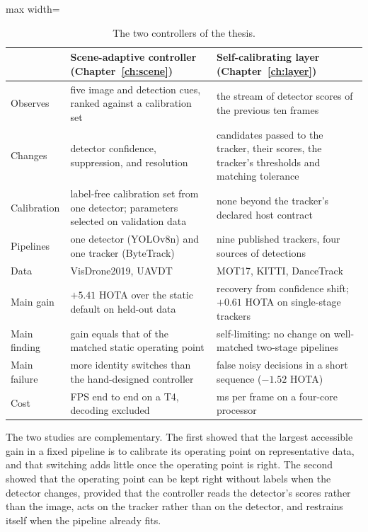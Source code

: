 \begin{table}[tbp]
\centering
\caption{The two controllers of the thesis.}
\label{tab:c-compare}
\small\setlength{\tabcolsep}{4pt}
\begin{adjustbox}{max width=\textwidth}
\begin{tabular}{>{\raggedright\arraybackslash}p{3.1cm}>{\raggedright\arraybackslash}p{5.6cm}>{\raggedright\arraybackslash}p{5.6cm}}
\toprule
 & Scene-adaptive controller (Chapter~\ref{ch:scene}) & Self-calibrating layer (Chapter~\ref{ch:layer}) \\
\midrule
Observes & five image and detection cues, ranked against a calibration set & the stream of detector scores of the previous ten frames \\
Changes & detector confidence, suppression, and resolution & candidates passed to the tracker, their scores, the tracker's thresholds and matching tolerance \\
Calibration & label-free calibration set from one detector; parameters selected on validation data & none beyond the tracker's declared host contract \\
Pipelines & one detector (YOLOv8n) and one tracker (ByteTrack) & nine published trackers, four sources of detections \\
Data & VisDrone2019, UAVDT & MOT17, KITTI, DanceTrack \\
Main gain & $+5.41$ HOTA over the static default on held-out data & recovery from confidence shift; $+0.61$ HOTA on single-stage trackers \\
Main finding & gain equals that of the matched static operating point & self-limiting: no change on well-matched two-stage pipelines \\
Main failure & more identity switches than the hand-designed controller & false noisy decisions in a short sequence ($-1.52$ HOTA) \\
Cost & 38.98 FPS end to end on a T4, decoding excluded & 2.95 ms per frame on a four-core processor \\
\bottomrule
\end{tabular}
\end{adjustbox}
\end{table}

The two studies are complementary. The first showed that the largest accessible gain in a fixed pipeline is to calibrate its operating point on representative data, and that switching adds little once the operating point is right. The second showed that the operating point can be kept right without labels when the detector changes, provided that the controller reads the detector's scores rather than the image, acts on the tracker rather than on the detector, and restrains itself when the pipeline already fits.

